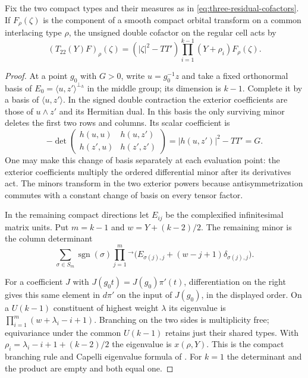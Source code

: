 \begin{auxlemma}\label{lem:residual-double-cofactor}
Fix the two compact types and their measures as in \eqref{eq:three-residual-cofactors}. If \(F_\rho(\zeta)\) is the component of a smooth compact orbital transform on a common interlacing type \(\rho\), the unsigned double cofactor on the regular cell acts by
\[
     (T_{22}(Y)F)_\rho(\zeta)
        = (|\zeta|^2-TT')\prod_{i=1}^{k-1}(Y+\rho_i)F_\rho(\zeta).
\]
\end{auxlemma}
\begin{proof}
At a point \(g_0\) with \(G>0\), write \(u=g_0^{-1}z\) and take a
fixed orthonormal basis of \(E_0=\langle u,z'\rangle^{\perp_h}\)
in the middle group; its dimension is \(k-1\). Complete it by a
basis of \(\langle u,z'\rangle\). In the signed double contraction
the exterior coefficients are those of \(u\wedge z'\) and its
Hermitian dual. In this basis the only surviving minor deletes the
first two rows and columns. Its scalar coefficient is
\[
 -\det\begin{pmatrix}h(u,u)&h(u,z')\\h(z',u)&h(z',z')\end{pmatrix}
       =|h(u,z')|^2-TT'=G .
\]
One may make this change of basis separately at each evaluation
point: the exterior coefficients multiply the ordered differential
minor after its derivatives act. The minors transform in the two
exterior powers because antisymmetrization commutes with a constant
change of basis on every tensor factor.

In the remaining compact directions let \(E_{ij}\) be the
complexified infinitesimal matrix units. Put \(m=k-1\) and
\(w=Y+(k-2)/2\). The remaining minor is the column determinant
\[
 \sum_{\sigma\in S_m}\operatorname{sgn}(\sigma)
   \prod_{j=1}^m{}^{\longrightarrow}
       \bigl(E_{\sigma(j),j}+(w-j+1)\delta_{\sigma(j),j}\bigr).
\]

For a coefficient \(J\) with \(J(g_0 t)=J(g_0)\pi'(t)\),
differentiation on the right gives this same element in \(d\pi'\)
on the input of \(J(g_0)\), in the displayed order. On a
\(U(k-1)\) constituent of highest weight \(\lambda\) its eigenvalue
is \(\prod_{i=1}^m(w+\lambda_i-i+1)\). 
Branching on the two
sides is multiplicity free; equivariance under the common
\(U(k-1)\) retains just their shared types. With
\(\rho_i=\lambda_i-i+1+(k-2)/2\) the eigenvalue is
\(x(\rho,Y)\). This is the compact branching rule and Capelli
eigenvalue formula of \cite[Theorems 2.1 and 2.20,
equation (2.39)]{molev-branching}. For \(k=1\) the determinant
and the product are empty and both equal one.
\end{proof}

